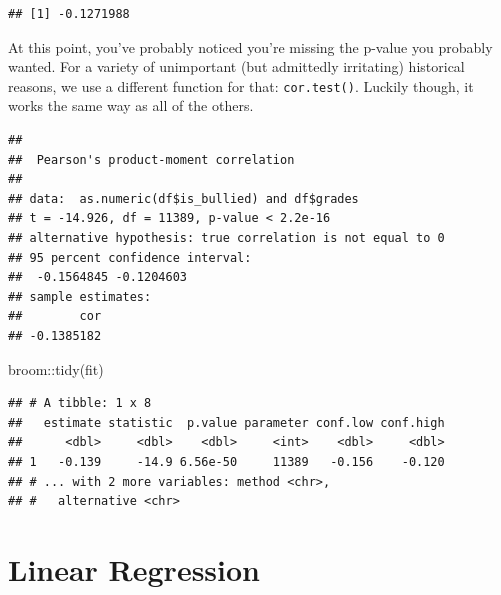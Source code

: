 \documentclass[
]{book}
\newenvironment{Shaded}{\begin{snugshade}}{\end{snugshade}}
\newcommand{\AttributeTok}[1]{\textcolor[rgb]{0.77,0.63,0.00}{#1}}
\newcommand{\FunctionTok}[1]{\textcolor[rgb]{0.00,0.00,0.00}{#1}}
\newcommand{\NormalTok}[1]{#1}
\newcommand{\OtherTok}[1]{\textcolor[rgb]{0.56,0.35,0.01}{#1}}
\newcommand{\SpecialCharTok}[1]{\textcolor[rgb]{0.00,0.00,0.00}{#1}}
\newcommand{\StringTok}[1]{\textcolor[rgb]{0.31,0.60,0.02}{#1}}
\begin{document}
\begin{verbatim}
## [1] -0.1271988
\end{verbatim}

At this point, you've probably noticed you're missing the p-value you probably wanted. For a variety of unimportant (but admittedly irritating) historical reasons, we use a different function for that: \texttt{cor.test()}. Luckily though, it works the same way as all of the others.

\begin{Shaded}
\end{Shaded}

\begin{verbatim}
## 
##  Pearson's product-moment correlation
## 
## data:  as.numeric(df$is_bullied) and df$grades
## t = -14.926, df = 11389, p-value < 2.2e-16
## alternative hypothesis: true correlation is not equal to 0
## 95 percent confidence interval:
##  -0.1564845 -0.1204603
## sample estimates:
##        cor 
## -0.1385182
\end{verbatim}

\begin{Shaded}
\begin{Highlighting}[]
\NormalTok{broom}\SpecialCharTok{::}\FunctionTok{tidy}\NormalTok{(fit)}
\end{Highlighting}
\end{Shaded}

\begin{verbatim}
## # A tibble: 1 x 8
##   estimate statistic  p.value parameter conf.low conf.high
##      <dbl>     <dbl>    <dbl>     <int>    <dbl>     <dbl>
## 1   -0.139     -14.9 6.56e-50     11389   -0.156    -0.120
## # ... with 2 more variables: method <chr>,
## #   alternative <chr>
\end{verbatim}

\hypertarget{linear-regression}{%
\chapter{Linear Regression}\label{linear-regression}}
\end{document}

